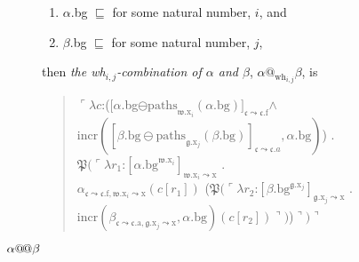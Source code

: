 \begin{description}
\begin{enumerate}
  \item $\alpha$.bg $\sqsubseteq$  for some natural number,
    $i$, and
    
  \item $\beta$.bg $\sqsubseteq$  for some natural number,
    $j$,
  \end{enumerate}
  then \textit{the \textit{wh}$_{i,j}$-combination of $\alpha$ and
    $\beta$}, $\alpha\text{@}_{\mathrm{wh}_{i,j}}\beta$, is
  \begin{quote}
    $\ulcorner\lambda
    c$:([$\alpha$.bg$\ominus\mathrm{paths}_{\mathfrak{w}.\text{x}_i}(\alpha.\text{bg})]_{\mathfrak{c}\leadsto\mathfrak{c}.\text{f}}$\d{$\wedge$}\\
    \hspace*{5em}$\mathrm{incr}([\beta.\text{bg}\ominus\mathrm{paths}_{\mathfrak{g}.\text{x}_j}(\beta.\text{bg})]_{\mathfrak{c}\leadsto\mathfrak{c}.a},\alpha.\text{bg})$)
    . \\
    \hspace*{1em} $\mathfrak{P}(\ulcorner\lambda r_1$:$[\alpha.\text{bg}^{\mathfrak{w}.\text{x}_i}]_{\mathfrak{w}.\text{x}_i\leadsto\text{x}}$ . \\
    \hspace*{4em}$\alpha_{\mathfrak{c}\leadsto\mathfrak{c}.\text{f},\mathfrak{w}.\text{x}_i\leadsto\text{x}}(c[r_1])$
    ($\mathfrak{P}(\ulcorner\lambda r_2$:$[\beta.\text{bg}^{\mathfrak{g}.\text{x}_j}]_{\mathfrak{g}.\text{x}_j\leadsto\text{x}}$ . \\
    \hspace*{15em}$\mathrm{incr}(\beta_{\mathfrak{c}\leadsto\mathfrak{c}.\text{a},\mathfrak{g}.\text{x}_j\leadsto\text{x}},\alpha.\text{bg})(c[r_2])\urcorner)$)$\urcorner)\urcorner$
  \end{quote} 

  \item[\textnormal{$\alpha\text{@\!@}\beta$}] \mbox{}


\end{description}
